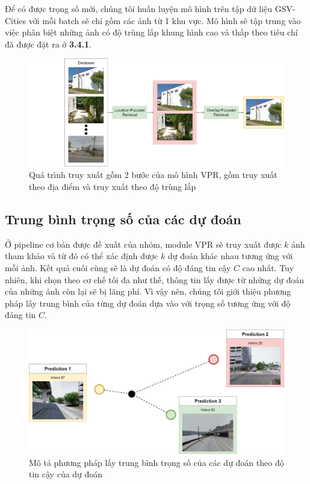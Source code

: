 Để có được trọng số mới, chúng tôi huấn luyện mô hình trên tập dữ liệu GSV-Cities \cite{Ali_bey_2022} với mỗi batch sẽ chỉ gồm các ảnh từ 1 khu vực. Mô hình sẽ tập trung vào việc phân biệt những ảnh có độ trùng lấp khung hình cao và thấp theo tiêu chí đã được đặt ra ở \textbf{3.4.1}.

\begin{figure}
  \centering
  \includegraphics[width=\textwidth]{pics/Proposal/rerank.drawio.png}
  \caption[Quá trình truy xuất 2 bước của VPR]{Quá trình truy xuất gồm 2 bước của mô hình VPR, gồm truy xuất theo địa điểm và truy xuất theo độ trùng lắp}
\end{figure}

\subsection{Trung bình trọng số của các dự đoán}

Ở pipeline cơ bản được đề xuất của nhóm, module VPR sẽ truy xuất được $k$ ảnh tham khảo và từ đó có thể xác định được $k$ dự đoán khác nhau tương ứng với mỗi ảnh. Kết quả cuối cùng sẽ là dự đoán có độ đáng tin cậy $C$ cao nhất. Tuy nhiên, khi chọn theo cơ chế tối đa như thế, thông tin lấy được từ những dự đoán của những ảnh còn lại sẽ bị lãng phí. Vì vậy nên, chúng tôi giới thiệu phương pháp lấy trung bình của từng dự đoán dựa vào với trọng số tương ứng với độ đáng tin $C$.

\begin{figure}[H]
  \centering
  \includegraphics[width=\textwidth]{pics/Proposal/weighted.png}
  \caption[Trung bình trọng số theo inliers của dự đoán]{Mô tả phương pháp lấy trung bình trọng số của các dự đoán theo độ tin cậy của dự đoán}
\end{figure}

